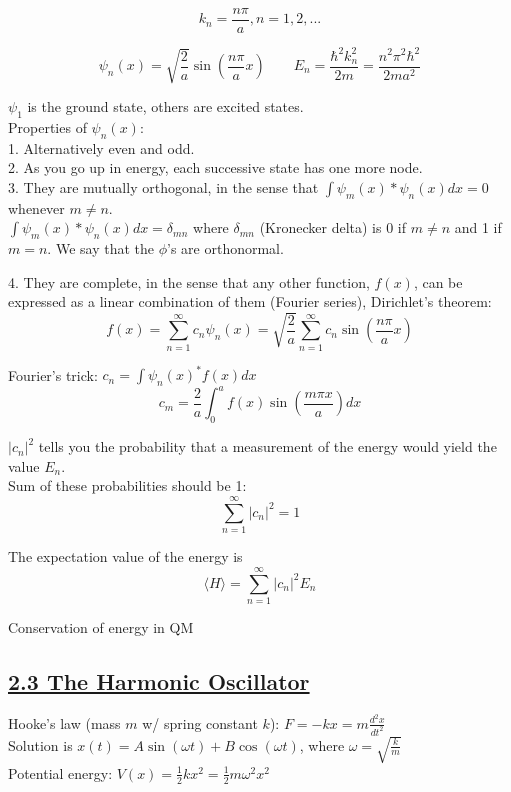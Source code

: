 $$k_n = \frac{n \pi}{a}, n = 1, 2, ...$$

$$\psi_n(x) = \sqrt{\frac{2}{a}} \sin(\frac{n \pi}{a} x) \qquad E_n = \frac{\hbar^2 k_n^2}{2m} = \frac{n^2 \pi^2 \hbar^2}{2ma^2}$$

$\psi_1$ is the ground state, others are excited states. \\

Properties of $\psi_n(x)$: \\
1. Alternatively even and odd. \\
2. As you go up in energy, each successive state has one more node. \\
3. They are mutually orthogonal, in the sense that $\int \psi_m(x)* \psi_n(x) dx = 0$ whenever $m \neq n$. \\

$\int \psi_m (x)* \psi_n(x) dx = \delta_{mn}$
where $\delta_{mn}$ (Kronecker delta) is 0 if $m \neq n$ and 1 if $m=n$. We say that the $\phi$'s are orthonormal.

4. They are complete, in the sense that any other function, $f(x)$, can be expressed as a linear combination of them (Fourier series), Dirichlet's theorem:
    $$f(x) = \sum_{n=1}^{\infty} c_n \psi_n(x) = \sqrt{\frac{2}{a}} \sum_{n=1}^{\infty} c_n \sin(\frac{n \pi}{a} x)$$

Fourier's trick: $c_n = \int \psi_n(x)^* f(x) dx$ \\
$$c_m = \frac{2}{a} \int_0^a f(x) \sin(\frac{m \pi x}{a}) dx$$

$|c_n|^2$ tells you the probability that a measurement of the energy would yield the value $E_n$. \\

Sum of these probabilities should be 1: 
    $$\sum_{n=1}^{\infty} |c_n|^2 = 1$$

The expectation value of the energy is
    $$\langle H \rangle = \sum_{n=1}^{\infty} |c_n|^2 E_n$$

Conservation of energy in QM

\subsection{\underline{2.3 The Harmonic Oscillator}}
Hooke's law (mass $m$ w/ spring constant $k$): $F = -kx = m \frac{d^2 x}{d t^2}$ \\
Solution is $x(t) = A \sin(\omega t) + B \cos(\omega t)$, where $\omega = \sqrt{\frac{k}{m}}$ \\
Potential energy: $V(x) = \frac{1}{2} k x^2 = \frac{1}{2} m \omega^2 x^2$ \\

